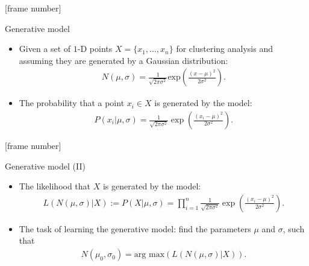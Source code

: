 \documentclass[aspectratio=169,t,xcolor=dvipsnames]{beamer}
\begin{document}
  {
    [frame number]
    \begin{frame}{Generative model}
      \centering
      \begin{itemize}
        \item Given a set of $1$-D points $X = \{x_1, \ldots, x_n\}$ for clustering analysis and assuming they are generated by a Gaussian distribution:
        \begin{align}
          N(\mu,\sigma) = \frac{1}{\sqrt{2 \pi \sigma^2}} \text{exp}\left({\frac{(x-\mu)^2}{2\sigma^2}}\right).
        \end{align}
        \item The probability that a point $x_i \in X$ is generated by the model:
        \begin{align}
          P(x_i \vert \mu, \sigma) = \frac{1}{\sqrt{2\pi\sigma^2}} \exp\left( \frac{(x_i-\mu)^2}{2\sigma^2}\right).
        \end{align}
      \end{itemize}
    \end{frame}
  }

  {
    [frame number]
    \begin{frame}{Generative model (II)}
      \centering
      \begin{itemize}
        \item The likelihood that $X$ is generated by the model:
        \begin{align}
          L(N(\mu,\sigma) \vert X) := P(X \vert \mu, \sigma) = \prod_{i=1}^{n} \frac{1}{\sqrt{2\pi\sigma^2}} \exp\left( \frac{(x_i-\mu)^2}{2\sigma^2}\right).
        \end{align}
        \item The task of learning the generative model: find the parameters $\mu$ and $\sigma$, such that
        \begin{align}
          N(\mu_0,\sigma_0) = \text{arg max}\left( L(N(\mu,\sigma)\vert X) \right).
        \end{align}
      \end{itemize}
    \end{frame}
  }
\end{document}
